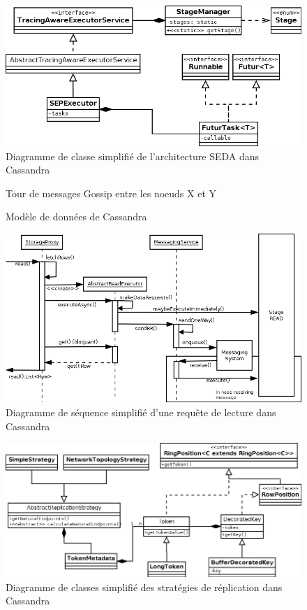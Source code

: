 \documentclass[12pt]{article}
\begin{document}
\begin{figure}[p]
	\centering
		\includegraphics[width=15cm]{schemas/stages_diagram.png}
	\caption{Diagramme de classe simplifié de l'architecture SEDA dans Cassandra \label{fig:stages_diagram}}
\end{figure}

\begin{figure}[p]
	\centering
		
	\caption{Tour de messages Gossip entre les noeuds X et Y \label{fig:round_gossip}}
\end{figure}

\begin{figure}[p]
	\centering
		
	\caption{Modèle de données de Cassandra \label{fig:keyspace}}
\end{figure}

\begin{figure}[p]
	\centering
		\includegraphics[width=15cm]{schemas/read_diagram.png}
	\caption{Diagramme de séquence simplifié d'une requête de lecture dans Cassandra \label{fig:read_diagram}}
\end{figure}

\begin{figure}[p]
	\centering
		\includegraphics[width=15cm]{schemas/replication_diagram.png}
	\caption{Diagramme de classes simplifié des stratégies de réplication dans Cassandra \label{fig:replication_diagram}}
\end{figure}
\end{document}
